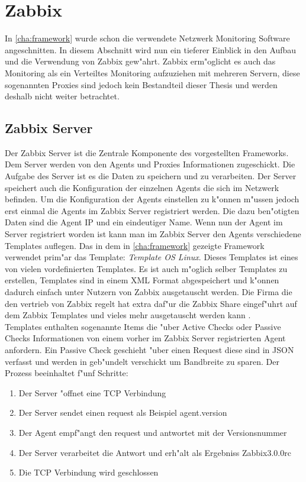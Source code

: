 \chapter{Zabbix}
\label{cha:zabbix}
In \cref{cha:framework} wurde schon die verwendete Netzwerk Monitoring Software angeschnitten. In diesem Abschnitt wird nun %
ein tieferer Einblick in den Aufbau und die Verwendung von Zabbix gew"ahrt. Zabbix erm"oglicht es %
auch das Monitoring als ein Verteiltes Monitoring aufzuziehen mit mehreren Servern, diese sogenannten Proxies %
sind jedoch kein Bestandteil dieser Thesis und werden deshalb nicht weiter betrachtet.

\section{Zabbix Server}
Der Zabbix Server ist die Zentrale Komponente des vorgestellten Frameworks. Dem Server werden von den Agents und Proxies %
Informationen zugeschickt. Die Aufgabe des Server ist es die Daten zu speichern und zu verarbeiten. %
Der Server speichert auch die Konfiguration der einzelnen Agents die sich im Netzwerk befinden. %
Um die Konfiguration der Agents einstellen zu k"onnen m"ussen jedoch erst einmal die Agents im Zabbix %
Server registriert werden. Die dazu ben"otigten Daten sind die Agent IP und ein eindeutiger Name. %
Wenn nun der Agent im Server registriert worden ist kann man im Zabbix Server den Agents verschiedene Templates auflegen. %
Das in dem in \cref{cha:framework} gezeigte Framework verwendet prim"ar das Template: \emph{Template OS %
Linux}. Dieses Templates ist eines von vielen vordefinierten Templates. Es ist auch m"oglich selber Templates %
zu erstellen, Templates sind in einem XML Format abgespeichert und k"onnen dadurch einfach unter Nutzern von Zabbix %
ausgetauscht werden. Die Firma die den vertrieb von Zabbix regelt hat extra daf"ur die Zabbix Share eingef"uhrt %
auf dem Zabbix Templates und vieles mehr ausgetauscht werden kann \autocite{zabbix:share}. \ \\ %
Templates enthalten sogenannte Items die "uber Active Checks oder Passive Checks Informationen von %
einem vorher im Zabbix Server registrierten Agent anfordern. Ein Passive Check geschieht "uber einen %
Request diese sind in JSON verfasst und werden in geb"undelt verschickt um Bandbreite zu sparen. %
Der Prozess beeinhaltet f"unf Schritte: %
\begin{enumerate}
\item Der Server "offnet eine TCP Verbindung %
\item Der Server sendet einen request als Beispiel agent.version %
\item Der Agent empf"angt den request und antwortet mit der Versionsnummer %
\item Der Server verarbeitet die Antwort und erh"alt als Ergebniss Zabbix3.0.0rc %
\item Die TCP Verbindung wird geschlossen %
\end{enumerate}
